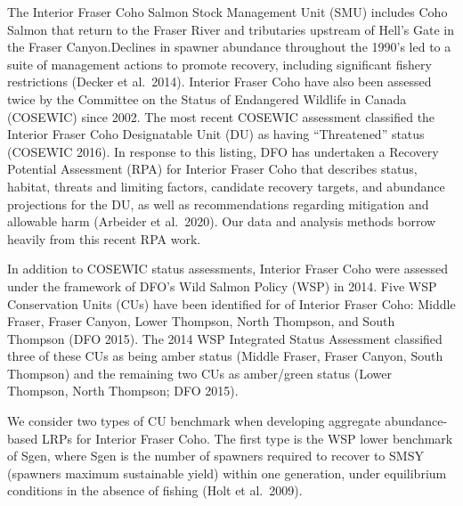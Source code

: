 \documentclass[11pt]{book}
\begin{document}
The Interior Fraser Coho Salmon Stock Management Unit (SMU) includes Coho Salmon that return to the Fraser River and tributaries upstream of Hell's Gate in the Fraser Canyon.Declines in spawner abundance throughout the 1990's led to a suite of management actions to promote recovery, including significant fishery restrictions (Decker et al.~2014). Interior Fraser Coho have also been assessed twice by the Committee on the Status of Endangered Wildlife in Canada (COSEWIC) since 2002. The most recent COSEWIC assessment classified the Interior Fraser Coho Designatable Unit (DU) as having ``Threatened'' status (COSEWIC 2016). In response to this listing, DFO has undertaken a Recovery Potential Assessment (RPA) for Interior Fraser Coho that describes status, habitat, threats and limiting factors, candidate recovery targets, and abundance projections for the DU, as well as recommendations regarding mitigation and allowable harm (Arbeider et al.~2020). Our data and analysis methods borrow heavily from this recent RPA work.

In addition to COSEWIC status assessments, Interior Fraser Coho were assessed under the framework of DFO's Wild Salmon Policy (WSP) in 2014. Five WSP Conservation Units (CUs) have been identified for of Interior Fraser Coho: Middle Fraser, Fraser Canyon, Lower Thompson, North Thompson, and South Thompson (DFO 2015). The 2014 WSP Integrated Status Assessment classified three of these CUs as being amber status (Middle Fraser, Fraser Canyon, South Thompson) and the remaining two CUs as amber/green status (Lower Thompson, North Thompson; DFO 2015).

We consider two types of CU benchmark when developing aggregate abundance-based LRPs for Interior Fraser Coho. The first type is the WSP lower benchmark of Sgen, where Sgen is the number of spawners required to recover to SMSY (spawners maximum sustainable yield) within one generation, under equilibrium conditions in the absence of fishing (Holt et al.~2009).
\end{document}

